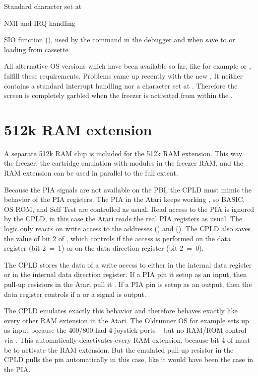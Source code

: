 \begin{itemize*}
\item Standard character set at 
\item NMI and IRQ handling
\item SIO function (), used by the  command in the
debugger and when save to or loading from cassette
\end{itemize*}

All alternative OS versions which have been available so far, like for example
 or , fulfill these requirements. Problems came up
recently with the new . It neither contains a standard
interrupt handling nor a character set at . Therefore the screen is
completely garbled when the freezer is activated from within the
.

\section{512k RAM extension}
A separate 512k RAM chip is included for the 512k RAM extension.
This way the freezer, the cartridge emulation with modules in the freezer RAM,
and the RAM extension can be used in parallel to the full extent.

Because the PIA signals are not available on the PBI, the CPLD must mimic the
behavior of the PIA registers. The PIA in the Atari keeps working , so BASIC, OS ROM, and Self Test are controlled as usual.
Read access to the PIA is ignored by the CPLD, \ie in this case the Atari reads
the real PIA registers as usual. The logic only reacts on write access to the
addresses  () and  (). The CPLD
also saves the value of bit 2 of , which controls if the access is
performed on the data register  (bit 2~=~1) or on the data direction
register (bit 2~=~0).

The CPLD stores the data of a write access to  either in the
internal data register or in the internal data direction register. If a PIA pin
it setup as an input, then pull-up resistors in the Atari pull it . If
a PIA pin is setup as an output, then the data register controls if a 
or a  signal is output.

The CPLD emulates exactly this behavior and therefore behaves exactly like
every other RAM extension in the Atari. The Oldrunner OS for example sets
 up as input because the 400/800 had 4 joystick ports -- but no
RAM/ROM control via . This automatically deactivates every RAM
extension, because bit 4 of  must be  to activate the RAM
extension. But the emulated pull-up resistor in the CPLD pulls the pin 
automatically in this case, like it would have been the case in the PIA.


